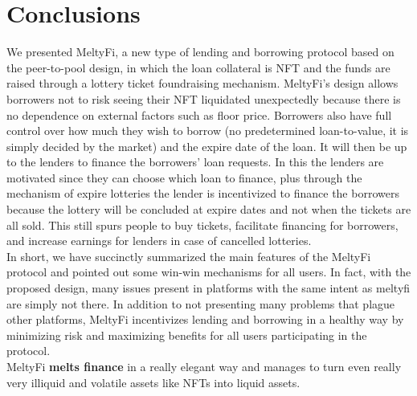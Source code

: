 \section{Conclusions}\label{sec:conclusions}
We presented MeltyFi, a new type of lending and borrowing protocol based on the peer-to-pool design, in which the loan collateral is NFT and the funds are raised through a lottery ticket foundraising mechanism. MeltyFi's design allows borrowers not to risk seeing their NFT liquidated unexpectedly because there is no dependence on external factors such as floor price. Borrowers also have full control over how much they wish to borrow (no predetermined loan-to-value, it is simply decided by the market) and the expire date of the loan. It will then be up to the lenders to finance the borrowers' loan requests. In this the lenders are motivated since they can choose which loan to finance, plus through the mechanism of expire lotteries the lender is incentivized to finance the borrowers because the lottery will be concluded at expire dates and not when the tickets are all sold. This still spurs people to buy tickets, facilitate financing for borrowers, and increase earnings for lenders in case of cancelled lotteries. 
\\
\indent In short, we have succinctly summarized the main features of the MeltyFi protocol and pointed out some win-win mechanisms for all users. In fact, with the proposed design, many issues present in platforms with the same intent as meltyfi are simply not there. In addition to not presenting many problems that plague other platforms, MeltyFi incentivizes lending and borrowing in a healthy way by minimizing risk and maximizing benefits for all users participating in the protocol. 
\\
\indent MeltyFi \textbf{melts finance} in a really elegant way and manages to turn even really very illiquid and volatile assets like NFTs into liquid assets.